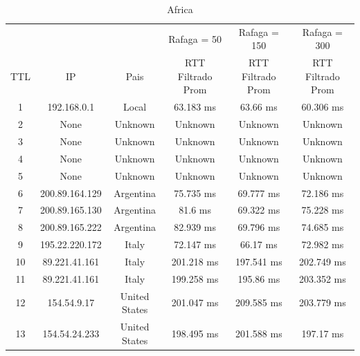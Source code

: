 \begin{table}[]
\centering
\caption{Africa}
\begin{tabular}{ | c | c | c | c | c | c | }
	\hline 
  & & & Rafaga = 50 & Rafaga = 150 &Rafaga = 300  \\ %
  TTL	&         IP        & 	        Pais      &  	 RTT Filtrado Prom  &	 RTT Filtrado Prom  & RTT Filtrado Prom  \\ \hline  
  1	&192.168.0.1        & 	       Local      &  	      63.183 ms     &	       63.66 ms     &      60.306 ms     \\ \hline  
  2	&None               & 	      Unknown     &  	      Unknown       &	      Unknown       &      Unknown       \\ \hline  
  3	&None               & 	      Unknown     &  	      Unknown       &	      Unknown       &      Unknown       \\ \hline  
  4	&None               & 	      Unknown     &  	      Unknown       &	      Unknown       &      Unknown       \\ \hline  
  5	&None               & 	      Unknown     &  	      Unknown       &	      Unknown       &      Unknown       \\ \hline  
  6	&200.89.164.129     & 	     Argentina    &  	      75.735 ms     &	      69.777 ms     &      72.186 ms     \\ \hline  
  7	&200.89.165.130     & 	     Argentina    &  	        81.6 ms     &	      69.322 ms     &      75.228 ms     \\ \hline  
  8	&200.89.165.222     & 	     Argentina    &  	      82.939 ms     &	      69.796 ms     &      74.685 ms     \\ \hline  
  9	&195.22.220.172     & 	       Italy      &  	      72.147 ms     &	       66.17 ms     &      72.982 ms     \\ \hline  
  10	&89.221.41.161      & 	       Italy      &  	     201.218 ms     &	     197.541 ms     &     202.749 ms     \\ \hline  
  11	&89.221.41.161      & 	       Italy      &  	     199.258 ms     &	      195.86 ms     &     203.352 ms     \\ \hline  
  12	&154.54.9.17        & 	   United States  &  	     201.047 ms     &	     209.585 ms     &     203.779 ms     \\ \hline  
  13	&154.54.24.233      & 	   United States  &  	     198.495 ms     &	     201.588 ms     &      197.17 ms     \\ \hline  

\end{tabular}
\end{table}
